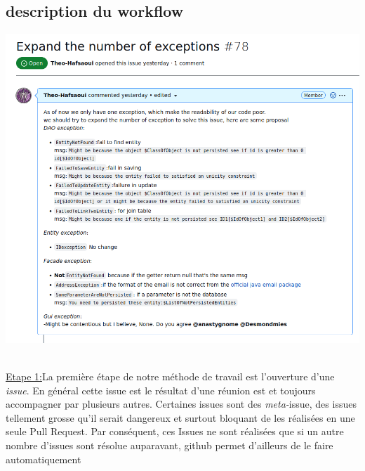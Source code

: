 \documentclass[a4paper,french,final]{memoir}
\begin{document}
\subsection{description du workflow}
\begin{minipage}{0.5\textwidth}
\includegraphics[width=\textwidth]{figures/issue.png}
\end{minipage}
\begin{minipage}{0.5\textwidth}
\vspace{0.5cm}\\
\underline{Etape 1:}La première étape de notre méthode de travail est l'ouverture d'une \emph{issue}.
En général cette issue est le résultat d'une réunion est et toujours accompagner par plusieurs autres.
Certaines issues sont des \emph{meta-}issue, des issues tellement grosse qu'il serait dangereux et surtout bloquant
de les réalisées en une seule Pull Request. Par conséquent, ces Issues ne sont réalisées que si un autre nombre d'issues sont
résolue auparavant, github permet d'ailleurs de le faire automatiquement
\vspace{2.5cm}\\
\end{minipage}
\end{document}
